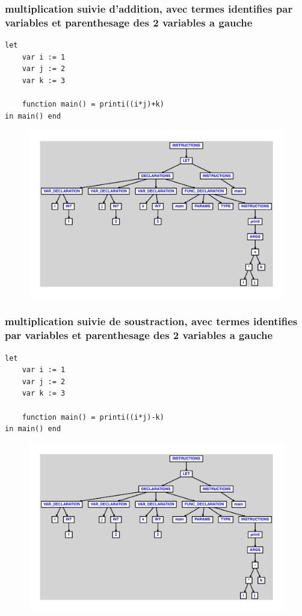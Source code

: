 \documentclass{article}
\begin{document}
\subsubsection{multiplication suivie d'addition, avec termes identifies par variables et parenthesage des 2 variables a gauche}
\begin{lstlisting}
let
	var i := 1
	var j := 2
	var k := 3

	function main() = printi((i*j)+k)
in main() end
\end{lstlisting}
\newpage
\begin{figure}[H]
\centering
\includegraphics[max width=\textwidth]{ast/ast_123.pdf}
\end{figure}
\newpage
\subsubsection{multiplication suivie de soustraction, avec termes identifies par variables et parenthesage des 2 variables a gauche}
\begin{lstlisting}
let
	var i := 1
	var j := 2
	var k := 3

	function main() = printi((i*j)-k)
in main() end
\end{lstlisting}
\newpage
\begin{figure}[H]
\centering
\includegraphics[max width=\textwidth]{ast/ast_124.pdf}
\end{figure}
\newpage
\end{document}
